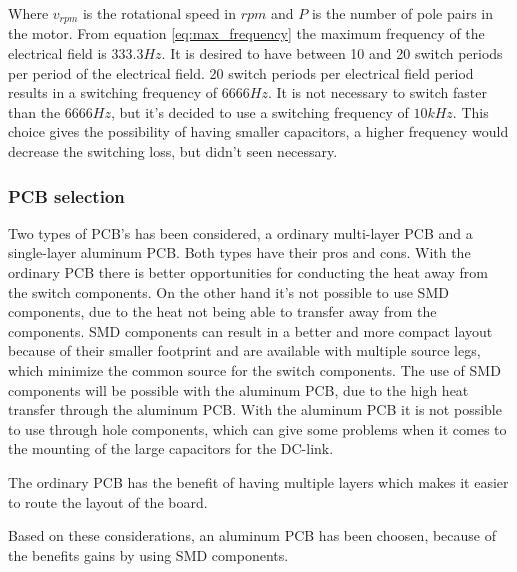 Where $v_{rpm}$ is the rotational speed in $rpm$ and $P$ is the number of pole pairs in the motor.
From equation \ref{eq:max_frequency} the maximum frequency of the electrical field is $333.3 Hz$.
It is desired to have between 10 and 20 switch periods per period of the electrical field. 20 switch periods per electrical field period results in a switching frequency of $6666 Hz$. It is not necessary to switch faster than the $6666 Hz$, but it's decided to use a switching frequency of $10 kHz$. This choice gives the possibility of having smaller capacitors, a higher frequency would decrease the switching loss, but didn't seen necessary. 


\subsubsection{PCB selection}   \label{PCB_selection}
Two types of PCB's has been considered, a ordinary multi-layer PCB and a single-layer aluminum PCB. Both types have their pros and cons. With the ordinary PCB there is better opportunities for conducting the heat away from the switch components. 
On the other hand it's not possible to use SMD components, due to the heat not being able to transfer away from the components. 
SMD components can result in a better and more compact layout because of their smaller footprint and are available with multiple source legs, which minimize the common source for the switch components. 
The use of SMD components will be possible with the aluminum PCB, due to the high heat transfer through the aluminum PCB.
With the aluminum PCB it is not possible to use through hole components, which can give some problems when it comes to the mounting of the large capacitors for the DC-link. 

The ordinary PCB has the benefit of having multiple layers which makes it easier to route the layout of the board. 

Based on these considerations, an aluminum PCB has been choosen,
because of the benefits gains by using SMD components.


